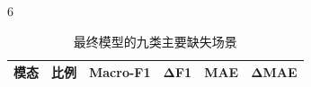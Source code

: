 \begin{PaperTable}{6}

\begin{table}[!htbp]
\centering\caption{最终模型的九类主要缺失场景\label{q2-tab10}}
\begin{tabular}{@{}llllll@{}}
\toprule
\begin{minipage}[b]{\dimexpr 0.130000\linewidth-1.300000\tabcolsep\relax}\raggedright
模态\strut
\end{minipage} & \begin{minipage}[b]{\dimexpr 0.120000\linewidth-1.200000\tabcolsep\relax}\raggedleft
比例\strut
\end{minipage} & \begin{minipage}[b]{\dimexpr 0.210000\linewidth-2.100000\tabcolsep\relax}\raggedleft
Macro-F1\strut
\end{minipage} & \begin{minipage}[b]{\dimexpr 0.180000\linewidth-1.800000\tabcolsep\relax}\raggedleft
ΔF1\strut
\end{minipage} & \begin{minipage}[b]{\dimexpr 0.180000\linewidth-1.800000\tabcolsep\relax}\raggedleft
MAE\strut
\end{minipage} & \begin{minipage}[b]{\dimexpr 0.180000\linewidth-1.800000\tabcolsep\relax}\raggedleft
ΔMAE\strut
\end{minipage}\tabularnewline
\midrule


\end{tabular}
\end{table}
\end{PaperTable}
